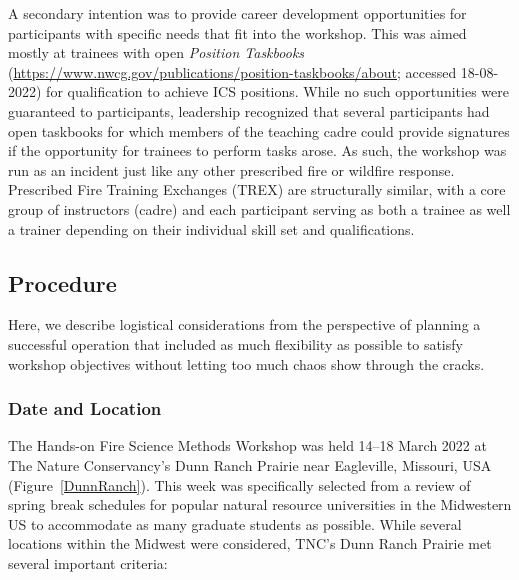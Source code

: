 \documentclass[fire,casereport,accept,moreauthors,pdftex]{Definitions/mdpi}  %
\begin{document}
A secondary intention was to provide career development opportunities for participants with specific needs that fit into the workshop.
This was aimed mostly at trainees with open \emph{Position Taskbooks} (\url{https://www.nwcg.gov/publications/position-taskbooks/about}; accessed 18-08-2022)  for qualification to achieve ICS positions.
While no such opportunities were guaranteed to participants, leadership recognized that several participants had open taskbooks for which members of the teaching cadre could provide signatures if the opportunity for trainees to perform tasks arose.
As such, the workshop was run as an incident just like any other prescribed fire or wildfire response. 
Prescribed Fire Training Exchanges (TREX) are structurally similar, with a core group of instructors (cadre) and each participant serving as both a trainee as well a trainer depending on their individual skill set and qualifications.   

\subsection{Procedure}

Here, we describe logistical considerations from the perspective of planning a successful operation that included as much flexibility as possible to satisfy workshop objectives without letting too much chaos show through the cracks.

\subsubsection{Date and Location}

The Hands-on Fire Science Methods Workshop was held 14--18 March 2022 at The Nature Conservancy's Dunn Ranch Prairie near Eagleville, Missouri, USA (Figure~\ref{DunnRanch}).
This week was specifically selected from a review of spring break schedules for popular natural resource universities in the Midwestern US to accommodate as many graduate students as possible.
While several locations within the Midwest were considered, TNC's Dunn Ranch Prairie met several important criteria:
\end{document}
